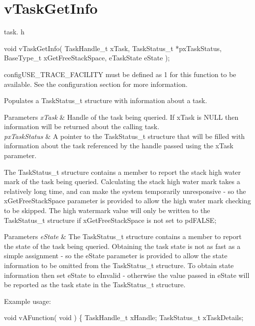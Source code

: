 \hypertarget{group__vTaskGetInfo}{}\section{v\+Task\+Get\+Info}
\label{group__vTaskGetInfo}
task. h 
\begin{DoxyPre}void vTaskGetInfo( TaskHandle\_t xTask, TaskStatus\_t *pxTaskStatus, BaseType\_t xGetFreeStackSpace, eTaskState eState );\end{DoxyPre}


config\+U\+S\+E\+\_\+\+T\+R\+A\+C\+E\+\_\+\+F\+A\+C\+I\+L\+I\+TY must be defined as 1 for this function to be available. See the configuration section for more information.

Populates a Task\+Status\+\_\+t structure with information about a task.


\begin{DoxyParams}{Parameters}
{\em x\+Task} & Handle of the task being queried. If x\+Task is N\+U\+LL then information will be returned about the calling task.\\
\hline
{\em px\+Task\+Status} & A pointer to the Task\+Status\+\_\+t structure that will be filled with information about the task referenced by the handle passed using the x\+Task parameter.\\
\hline
\end{DoxyParams}
The Task\+Status\+\_\+t structure contains a member to report the stack high water mark of the task being queried. Calculating the stack high water mark takes a relatively long time, and can make the system temporarily unresponsive -\/ so the x\+Get\+Free\+Stack\+Space parameter is provided to allow the high water mark checking to be skipped. The high watermark value will only be written to the Task\+Status\+\_\+t structure if x\+Get\+Free\+Stack\+Space is not set to pd\+F\+A\+L\+SE;


\begin{DoxyParams}{Parameters}
{\em e\+State} & The Task\+Status\+\_\+t structure contains a member to report the state of the task being queried. Obtaining the task state is not as fast as a simple assignment -\/ so the e\+State parameter is provided to allow the state information to be omitted from the Task\+Status\+\_\+t structure. To obtain state information then set e\+State to e\+Invalid -\/ otherwise the value passed in e\+State will be reported as the task state in the Task\+Status\+\_\+t structure.\\
\hline
\end{DoxyParams}
Example usage\+: 
\begin{DoxyPre}
void vAFunction( void )
\{
TaskHandle\_t xHandle;
TaskStatus\_t xTaskDetails;\end{DoxyPre}



